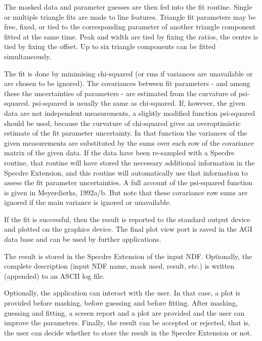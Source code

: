 \begin{description}
\begin{description}
\begin{terminalv}
   The masked data and parameter guesses are then fed into the fit
   routine. Single or multiple triangle fits are made to line
   features. Triangle fit parameters may be free, fixed, or tied to
   the corresponding parameter of another triangle component fitted
   at the same time. Peak and width are tied by fixing the ratios,
   the centre is tied by fixing the offset. Up to six triangle
   components can be fitted simultaneously.

   The fit is done by minimising chi-squared (or rms if variances are
   unavailable or are chosen to be ignored). The covariances between
   fit parameters - and among these the uncertainties of parameters -
   are estimated from the curvature of psi-squared. psi-squared is
   usually the same as chi-squared. If, however, the given data are
   not independent measurements, a slightly modified function
   psi-squared should be used, because the curvature of chi-squared
   gives an overoptimistic estimate of the fit parameter uncertainty.
   In that function the variances of the given measurements are
   substituted by the sums over each row of the covariance matrix of
   the given data. If the data have been re-sampled with a Specdre
   routine, that routine will have stored the necessary additional
   information in the Specdre Extension, and this routine will
   automatically use that information to assess the fit parameter
   uncertainties. A full account of the psi-squared function is given
   in Meyerdierks, 1992a/b. But note that these covariance row sums
   are ignored if the main variance is ignored or unavailable.

   If the fit is successful, then the result is reported to
   the standard output device and plotted on the graphics device. The
   final plot view port is saved in the AGI data base and can be used
   by further applications.

   The result is stored in the Specdre Extension of the input NDF.
   Optionally, the complete description (input NDF name, mask used,
   result, etc.) is written (appended) to an ASCII log file.

   Optionally, the application can interact with the user. In that
   case, a plot is provided before masking, before guessing and
   before fitting. After masking, guessing and fitting, a screen
   report and a plot are provided and the user can improve the
   parameters. Finally, the result can be accepted or rejected, that
   is, the user can decide whether to store the result in the Specdre
   Extension or not.


\end{terminalv}
\end{description}
\end{description}
